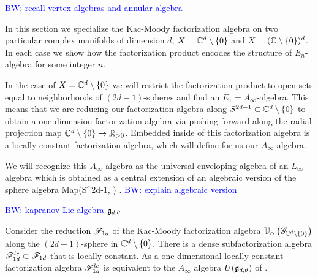 \documentclass[10pt]{amsart}
\def\brian{\textcolor{blue}{BW: }\textcolor{blue}}
\begin{document}
\brian{recall vertex algebras and annular algebra}

In this section we specialize the Kac-Moody factorization algebra on two particular complex manifolds of dimension $d$, $X = \mathbb C^d \setminus \{0\}$ and $X = (\mathbb C \setminus \{0\})^d$. 
In each case we show how the factorization product encodes the structure of $E_n$-algebra for some integer $n$.

In the case of $X = \mathbb C^d \setminus \{0\}$ we will restrict the factorization product to open sets equal to neighborhoods of $(2d-1)$-spheres and find an $E_1 = A_\infty$-algebra.
This means that we are reducing our factorization algebra along $S^{2d-1} \subset \mathbb C^d \setminus \{0\}$ to obtain a one-dimension factorization algebra via pushing forward along the radial projection map $\mathbb C^d \setminus \{0\} \to \mathbb R_{>0}$.
Embedded inside of this factorization algebra is a locally constant factorization algebra, which will define for us our $A_\infty$-algebra.

We will recognize this $A_\infty$-algebra as the universal enveloping algebra of an $L_\infty$ algebra which is obtained as a central extension of an algebraic version of the sphere algebra
\ben
{\rm Map}(S^{2d-1}, \fg) .
\een
\brian{explain algebraic version}

\brian{kapranov Lie algebra $\mathfrak g_{d, \theta}$}

\begin{thm}\label{thm sphere alg}
Consider the reduction $\mathscr F_{1d}$ of the Kac-Moody factorization algebra $\mathbb U_\alpha\left(\mathscr G_{\mathbb C^{d} \setminus \{0\}} \right)$ along the $(2d-1)$-sphere in $\mathbb C^{d} \setminus \{0\}$.
There is a dense subfactorization algebra $\mathscr F^{lc}_{1d} \subset \mathscr F_{1d}$ that is locally constant. 
As a one-dimensional locally constant factorization algebra $\mathscr F^{lc}_{1d}$ is equivalent to the $A_\infty$ algebra $U(\mathfrak g_{d,\theta})$ of \cite{FHK}.
\end{thm}

\end{document}

